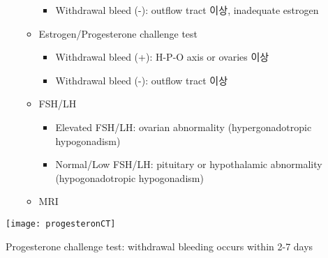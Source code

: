 \begin{enumerate}
\begin{itemize}
\begin{itemize}
		\item Withdrawal bleed (-): outflow tract 이상, inadequate estrogen
		\end{itemize}
	\item Estrogen/Progesterone challenge test
		\begin{itemize}\tightlist
		\item Withdrawal bleed (+): H-P-O axis or ovaries 이상 
		\item Withdrawal bleed (-): outflow tract 이상 
		\end{itemize}
	\item FSH/LH 
		\begin{itemize}\tightlist
		\item Elevated FSH/LH: ovarian abnormality (hypergonadotropic hypogonadism)
		\item Normal/Low FSH/LH: pituitary or hypothalamic abnormality (hypogonadotropic hypogonadism) 
		\end{itemize}
	\item MRI 
	\end{itemize}
\end{enumerate}
\hspace{-1cm}
\texttt{[image: progesteronCT]}\\
\begin{mdframed}[linecolor=blue,middlelinewidth=2]
Progesterone challenge test: withdrawal bleeding occurs within 2-7 days 
\end{mdframed}
